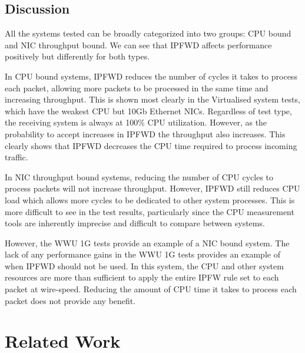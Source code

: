 \documentclass[journal]{IEEEtran}
\begin{document}


  \subsection{Discussion} 

    All the systems tested can be broadly categorized into two groups: CPU
    bound and NIC throughput bound. We can see that IPFWD affects performance
    positively but differently for both types. 

    In CPU bound systems, IPFWD reduces the number of cycles it takes to
    process each packet, allowing more packets to be processed in the same time
    and increasing throughput. This is shown most clearly in the Virtualised
    system tests, which have the weakest CPU but 10Gb Ethernet NICs. Regardless
    of test type, the receiving system is always at 100\% CPU utilization.
    However, as the probability to accept increases in IPFWD the throughput
    also increases.  This clearly shows that IPFWD decreases the CPU time
    required to process incoming traffic.

    In NIC throughput bound systems, reducing the number of CPU cycles to
    process packets will not increase throughput. However, IPFWD still reduces
    CPU load which allows more cycles to be dedicated to other system
    processes. This is more difficult to see in the test results, particularly
    since the CPU measurement tools are inherently imprecise and difficult to
    compare between systems. 
    
    However, the WWU 1G tests provide an example of a NIC bound system. The
    lack of any performance gains in the WWU 1G tests provides an example of
    when IPFWD should not be used. In this system, the CPU and other system
    resources are more than sufficient to apply the entire IPFW rule set to
    each packet at wire-speed. Reducing the amount of CPU time it takes to
    process each packet does not provide any benefit.


\section{Related Work}
\end{document}
